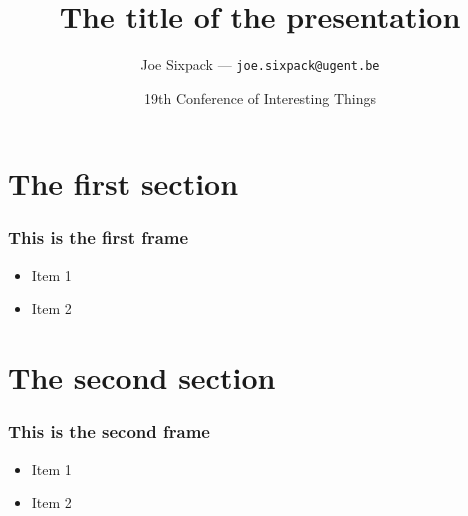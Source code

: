 \documentclass[aspectratio=169]{beamer}
\title{The title of the presentation}
\date{19th Conference of Interesting Things}
\author{Joe Sixpack --- \texttt{joe.sixpack@ugent.be}}
\begin{document}
\logoframe

\titleframe

\section{The first section}

\begin{frame}
    \frametitle{This is the first frame} 
    \begin{itemize}
        \item Item 1
        \item Item 2
    \end{itemize}
\end{frame}

\section{The second section}

\begin{frame}
    \frametitle{This is the second frame} 
    \begin{itemize}
        \item Item 1
        \item Item 2
    \end{itemize}
\end{frame}
\end{document}
